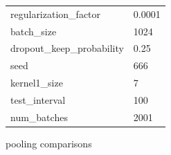 \documentclass{article}
\begin{document}
\begin{enumerate}
\begin{item}
\begin{figure}[h]
\begin{subtable}[b]{0.8\textwidth}
\begin{tabular}{ll}
					regularization\_factor & 0.0001 \\
					batch\_size & 1024 \\
					dropout\_keep\_probability & 0.25 \\
					seed & 666 \\
					kernel1\_size & 7 \\
					test\_interval & 100 \\
					num\_batches & 2001 \\
					\bottomrule
				\end{tabular}
			\end{subtable}
			\quad	
			\caption{pooling comparisons}
			\label{pooling_comparisons}
			
		\end{figure}
	\end{item}

	
\end{enumerate}
\end{document}
